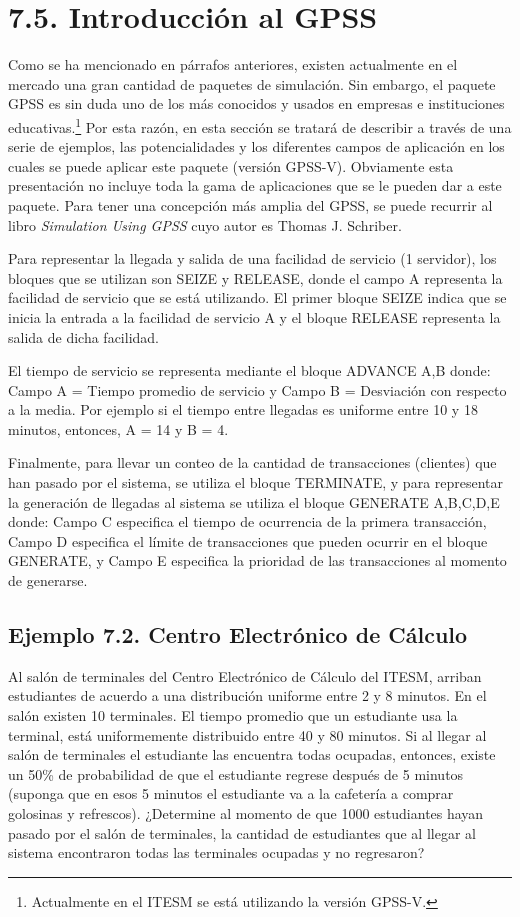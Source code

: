 \documentclass[11pt,letterpaper]{report}
\begin{document}
\section*{7.5. Introducción al GPSS}

Como se ha mencionado en párrafos anteriores, existen actualmente en el
mercado una gran cantidad de paquetes de simulación. Sin embargo, el
paquete GPSS es sin duda uno de los más conocidos y usados en empresas e
instituciones educativas.\footnote{Actualmente en el ITESM se está
utilizando la versión GPSS-V.} Por esta razón, en esta sección se
tratará de describir a través de una serie de ejemplos, las
potencialidades y los diferentes campos de aplicación en los cuales se
puede aplicar este paquete (versión GPSS-V). Obviamente esta
presentación no incluye toda la gama de aplicaciones que se le pueden
dar a este paquete. Para tener una concepción más amplia del GPSS, se
puede recurrir al libro \emph{Simulation Using GPSS} cuyo autor es
Thomas J. Schriber.

Para representar la llegada y salida de una facilidad de servicio
(1 servidor), los bloques que se utilizan son SEIZE y RELEASE, donde el
campo A representa la facilidad de servicio que se está utilizando. El
primer bloque SEIZE indica que se inicia la entrada a la facilidad de
servicio A y el bloque RELEASE representa la salida de dicha facilidad.

El tiempo de servicio se representa mediante el bloque ADVANCE A,B
donde: Campo A = Tiempo promedio de servicio y Campo B = Desviación con
respecto a la media. Por ejemplo si el tiempo entre llegadas es
uniforme entre 10 y 18 minutos, entonces, A = 14 y B = 4.

Finalmente, para llevar un conteo de la cantidad de transacciones
(clientes) que han pasado por el sistema, se utiliza el bloque
TERMINATE, y para representar la generación de llegadas al sistema se
utiliza el bloque GENERATE A,B,C,D,E donde: Campo C especifica el tiempo
de ocurrencia de la primera transacción, Campo D especifica el límite de
transacciones que pueden ocurrir en el bloque GENERATE, y Campo E
especifica la prioridad de las transacciones al momento de generarse.

\subsection*{Ejemplo 7.2. Centro Electrónico de Cálculo}

Al salón de terminales del Centro Electrónico de Cálculo del ITESM,
arriban estudiantes de acuerdo a una distribución uniforme entre 2 y 8
minutos. En el salón existen 10 terminales. El tiempo promedio que un
estudiante usa la terminal, está uniformemente distribuido entre 40 y
80 minutos. Si al llegar al salón de terminales el estudiante las
encuentra todas ocupadas, entonces, existe un 50\% de probabilidad de
que el estudiante regrese después de 5 minutos (suponga que en esos 5
minutos el estudiante va a la cafetería a comprar golosinas y
refrescos). ¿Determine al momento de que 1000 estudiantes hayan pasado
por el salón de terminales, la cantidad de estudiantes que al llegar al
sistema encontraron todas las terminales ocupadas y no regresaron?
\end{document}
